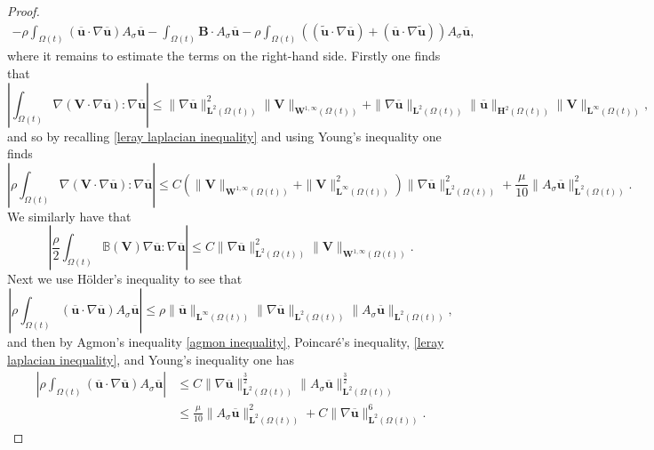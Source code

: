 \documentclass[a4paper]{amsart}
\numberwithin{equation}{section}
\newcommand{\grad}{\nabla}
\theoremstyle{plain}
\newcommand{\mbf}[1]{\mathbf{#1}}
\newcommand{\mbb}[1]{\mathbb{#1}}
\begin{document}
\begin{proof}
\begin{multline}
        - \rho \int_{\Omega(t)} \left(\overline{\mbf{u}} \cdot \grad \overline{\mbf{u}}\right) A_{\sigma}\overline{\mbf{u}} - \int_{\Omega(t)} \mbf{B} \cdot A_{\sigma} \overline{\mbf{u}}
        -\rho \int_{\Omega(t)} \left((\widetilde{\mbf{u}} \cdot \grad \overline{\mbf{u}}) + (\overline{\mbf{u}} \cdot \grad\widetilde{\mbf{u}}) \right)A_{\sigma} \overline{\mbf{u}},
        \label{fsi energyestimate pf}
        \end{multline}
	where it remains to estimate the terms on the right-hand side.
	Firstly one finds that 
    \[ \left| \int_{\Omega(t)} \grad(\mbf{V} \cdot \grad \overline{\mbf{u}}): \grad \overline{\mbf{u}} \right| \leq \|\grad \overline{\mbf{u}}\|_{\mbf{L}^2(\Omega(t))}^2 \|\mbf{V}\|_{\mbf{W}^{1,\infty}(\Omega(t))} + \| \grad \overline{\mbf{u}}\|_{\mbf{L}^2(\Omega(t))} \|\overline{\mbf{u}}\|_{\mbf{H}^2(\Omega(t))}\|\mbf{V}\|_{\mbf{L}^\infty(\Omega(t))},\]
	and so by recalling \eqref{leray laplacian inequality} and using Young's inequality one finds
	\[ \left| \rho \int_{\Omega(t)} \grad(\mbf{V} \cdot \grad \overline{\mbf{u}}): \grad \overline{\mbf{u}} \right| \leq C \left(\|\mbf{V}\|_{\mbf{W}^{1,\infty}(\Omega(t))} + \|\mbf{V}\|_{\mbf{L}^\infty(\Omega(t))}^2 \right)\|\grad \overline{\mbf{u}}\|_{\mbf{L}^2(\Omega(t))}^2  + \frac{\mu}{10}\|A_{\sigma}\overline{\mbf{u}}\|_{\mbf{L}^2(\Omega(t))}^2.  \]
    We similarly have that
    \[ \left| \frac{\rho}{2} \int_{\Omega(t)} \mbb{B}(\mbf{V}) \grad \overline{\mbf{u}} : \grad \overline{\mbf{u}} \right| \leq C \|\grad \overline{\mbf{u}}\|_{\mbf{L}^2(\Omega(t))}^2 \|\mbf{V}\|_{\mbf{W}^{1,\infty}(\Omega(t))}. \]
	Next we use H\"older's inequality to see that
	\[ \left| \rho \int_{\Omega(t)} \left(\overline{\mbf{u}} \cdot \grad \overline{\mbf{u}}\right) A_{\sigma}\overline{\mbf{u}} \right| \leq \rho \|\overline{\mbf{u}}\|_{\mbf{L}^\infty(\Omega(t))} \|\grad \overline{\mbf{u}}\|_{\mbf{L}^2(\Omega(t))} \|A_{\sigma} \overline{\mbf{u}}\|_{\mbf{L}^2(\Omega(t))}, \]
	and then by Agmon's inequality \eqref{agmon inequality}, Poincar\'e's inequality, \eqref{leray laplacian inequality}, and Young's inequality one has
    \begin{align*}
        \left| \rho \int_{\Omega(t)} \left(\overline{\mbf{u}} \cdot \grad \overline{\mbf{u}}\right) A_{\sigma}\overline{\mbf{u}} \right| &\leq C\|\grad \overline{\mbf{u}}\|_{\mbf{L}^2(\Omega(t))}^\frac{3}{2} \|A_{\sigma} \overline{\mbf{u}}\|_{\mbf{L}^2(\Omega(t))}^\frac{3}{2}\\
        &\leq \frac{\mu}{10} \|A_{\sigma} \overline{\mbf{u}}\|_{\mbf{L}^2(\Omega(t))}^2 + C \|\grad \overline{\mbf{u}}\|_{\mbf{L}^2(\Omega(t))}^6.

\end{align*}
\end{proof}
\end{document}
